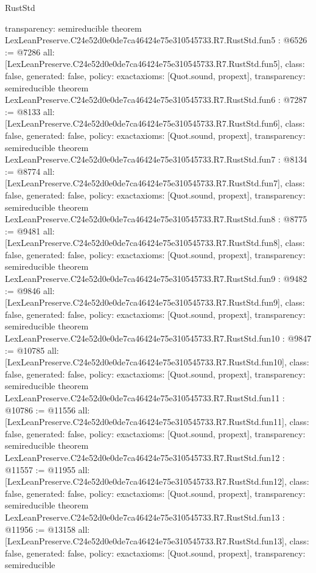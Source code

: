 \begin{lexlean}{RustStd}
\begin{coremodule}
{  transparency: semireducible
}
theorem LexLeanPreserve.C24e52d0e0de7ca46424e75e310545733.R7.RustStd.fun5 : @6526 := @7286 {
  all: [LexLeanPreserve.C24e52d0e0de7ca46424e75e310545733.R7.RustStd.fun5],
  class: false,
  generated: false,
  policy: exact{axioms: [Quot.sound, propext]},
  transparency: semireducible
}
theorem LexLeanPreserve.C24e52d0e0de7ca46424e75e310545733.R7.RustStd.fun6 : @7287 := @8133 {
  all: [LexLeanPreserve.C24e52d0e0de7ca46424e75e310545733.R7.RustStd.fun6],
  class: false,
  generated: false,
  policy: exact{axioms: [Quot.sound, propext]},
  transparency: semireducible
}
theorem LexLeanPreserve.C24e52d0e0de7ca46424e75e310545733.R7.RustStd.fun7 : @8134 := @8774 {
  all: [LexLeanPreserve.C24e52d0e0de7ca46424e75e310545733.R7.RustStd.fun7],
  class: false,
  generated: false,
  policy: exact{axioms: [Quot.sound, propext]},
  transparency: semireducible
}
theorem LexLeanPreserve.C24e52d0e0de7ca46424e75e310545733.R7.RustStd.fun8 : @8775 := @9481 {
  all: [LexLeanPreserve.C24e52d0e0de7ca46424e75e310545733.R7.RustStd.fun8],
  class: false,
  generated: false,
  policy: exact{axioms: [Quot.sound, propext]},
  transparency: semireducible
}
theorem LexLeanPreserve.C24e52d0e0de7ca46424e75e310545733.R7.RustStd.fun9 : @9482 := @9846 {
  all: [LexLeanPreserve.C24e52d0e0de7ca46424e75e310545733.R7.RustStd.fun9],
  class: false,
  generated: false,
  policy: exact{axioms: [Quot.sound, propext]},
  transparency: semireducible
}
theorem LexLeanPreserve.C24e52d0e0de7ca46424e75e310545733.R7.RustStd.fun10 : @9847 := @10785 {
  all: [LexLeanPreserve.C24e52d0e0de7ca46424e75e310545733.R7.RustStd.fun10],
  class: false,
  generated: false,
  policy: exact{axioms: [Quot.sound, propext]},
  transparency: semireducible
}
theorem LexLeanPreserve.C24e52d0e0de7ca46424e75e310545733.R7.RustStd.fun11 : @10786 := @11556 {
  all: [LexLeanPreserve.C24e52d0e0de7ca46424e75e310545733.R7.RustStd.fun11],
  class: false,
  generated: false,
  policy: exact{axioms: [Quot.sound, propext]},
  transparency: semireducible
}
theorem LexLeanPreserve.C24e52d0e0de7ca46424e75e310545733.R7.RustStd.fun12 : @11557 := @11955 {
  all: [LexLeanPreserve.C24e52d0e0de7ca46424e75e310545733.R7.RustStd.fun12],
  class: false,
  generated: false,
  policy: exact{axioms: [Quot.sound, propext]},
  transparency: semireducible
}
theorem LexLeanPreserve.C24e52d0e0de7ca46424e75e310545733.R7.RustStd.fun13 : @11956 := @13158 {
  all: [LexLeanPreserve.C24e52d0e0de7ca46424e75e310545733.R7.RustStd.fun13],
  class: false,
  generated: false,
  policy: exact{axioms: [Quot.sound, propext]},
  transparency: semireducible
}
\end{coremodule}
\end{lexlean}
